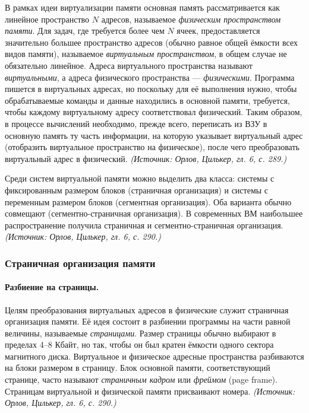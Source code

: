 \documentclass[a4paper,12pt]{article}
\begin{document}
В рамках идеи виртуализации памяти основная память рассматривается как линейное пространство \(N\) адресов, называемое \emph{физическим пространством памяти}. Для задач, где требуется более чем \(N\) ячеек, предоставляется значительно большее пространство адресов (обычно равное общей ёмкости всех видов памяти), называемое \emph{виртуальным пространством}, в общем случае не обязательно линейное. Адреса виртуального пространства называют \emph{виртуальными}, а адреса физического пространства --- \emph{физическими}. Программа пишется в виртуальных адресах, но поскольку для её выполнения нужно, чтобы обрабатываемые команды и данные находились в основной памяти, требуется, чтобы каждому виртуальному адресу соответствовал физический. Таким образом, в процессе вычислений необходимо, прежде всего, переписать из ВЗУ в основную память ту часть информации, на которую указывает виртуальный адрес (отобразить виртуальное пространство на физическое), после чего преобразовать виртуальный адрес в физический.
\textit{(Источник: Орлов, Цилькер, гл. 6, с. 289.)}

Среди систем виртуальной памяти можно выделить два класса: системы с фиксированным размером блоков (страничная организация) и системы с переменным размером блоков (сегментная организация). Оба варианта обычно совмещают (сегментно-страничная организация). В современных ВМ наибольшее распространение получила страничная и сегментно-страничная организация.
\textit{(Источник: Орлов, Цилькер, гл. 6, с. 290.)}

\subsubsection{Страничная организация памяти}

\paragraph{Разбиение на страницы.}
Целям преобразования виртуальных адресов в физические служит страничная организация памяти. Её идея состоит в разбиении программы на части равной величины, называемые \emph{страницами}. Размер страницы обычно выбирают в пределах 4--8 Кбайт, но так, чтобы он был кратен ёмкости одного сектора магнитного диска. Виртуальное и физическое адресные пространства разбиваются на блоки размером в страницу. Блок основной памяти, соответствующий странице, часто называют \emph{страничным кадром} или \emph{фреймом} (page frame). Страницам виртуальной и физической памяти присваивают номера.
\textit{(Источник: Орлов, Цилькер, гл. 6, с. 290.)}
\end{document}
